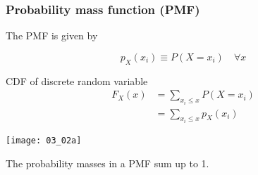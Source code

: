 \documentclass[usenames,dvipsnames,smaller]{beamer}
\newcommand{\?}{\stackrel{?}{=}}
\begin{document}
 \begin{frame}
  \frametitle{Probability mass function (PMF)}\pause
  \begin{minipage}{.45\linewidth}
  The PMF is given by \pause

  \begin{equation}
    \label{eq:12}
    p_X(x_i) \equiv P(X = x_i) \quad \forall x
  \end{equation}

  \pause
  
  \begin{alertblock}{CDF of discrete random variable}
    \pause
    \begin{align*}
      \label{eq:14}
      F_X(x) &= \sum_{x_i \le x} P(X = x_i)\\
             &= \sum_{x_i \le x}p_X(x_i)
    \end{align*}
  \end{alertblock}
  \end{minipage}\qquad \pause
  \begin{minipage}{.45\linewidth}
    \texttt{[image: 03\_02a]}
  \end{minipage}
  
  \pause

  \bigskip
  
  The probability masses in a PMF sum up to 1.
\end{frame}
\end{document}
